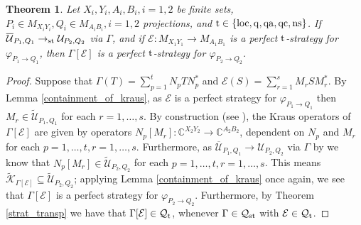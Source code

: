 \documentclass[11pt]{amsart}
\newtheorem{theorem}{Theorem}[section]
\newcommand{\cl}[1]{\mathcal{#1}}
\newcommand{\bb}[1]{\mathbb{#1}}
\begin{document}
\begin{theorem}\label{perfect_strats_imp_games}
Let $X_{i}, Y_{i}, A_{i}, B_{i}, i = 1, 2$ be finite sets, $P_{i} \in M_{X_{i}Y_{i}}, Q_{i} \in M_{A_{i}B_{i}}, i = 1, 2$ projections, and ${\rm t} \in \{\rm loc, q, qa, qc, ns\}$. If $\overline{\cl{U}}_{P_{1}, Q_{1}}\rightarrow_{\rm st} \cl{U}_{P_{2}, Q_{2}}$ via $\Gamma$, and if $\cl{E}: M_{X_{1}Y_{1}}\rightarrow M_{A_{1}B_{1}}$ is a perfect ${\rm t}$-strategy for $\varphi_{P_{1}\rightarrow Q_{1}}$, then $\Gamma[\cl{E}]$ is a perfect ${\rm t}$-strategy for $\varphi_{P_{2}\rightarrow Q_{2}}$. 
\end{theorem}
\begin{proof}
Suppose that $\Gamma(T) = \sum\limits_{p=1}^{t}N_{p}TN_{p}^{*}$ and $\cl{E}(S) = \sum\limits_{r=1}^{s}M_{r}SM_{r}^{*}$. By Lemma \ref{containment_of_kraus}, as $\cl{E}$ is a perfect strategy for $\varphi_{P_{1}\rightarrow Q_{1}}$ then $M_{r} \in \tilde{\cl{U}}_{P_{1}, Q_{1}}$ for each $r = 1, \hdots, s$. By construction (see \cite{gt_two}), the Kraus operators of $\Gamma[\cl{E}]$ are given by operators $N_{p}[M_{r}]: \bb{C}^{X_{2}Y_{2}}\rightarrow \bb{C}^{A_{2}B_{2}}$, dependent on $N_{p}$ and $M_{r}$ for each $p= 1, \hdots, t, r= 1, \hdots, s$. Furthermore, as $\overline{\cl{U}}_{P_{1}, Q_{1}}\rightarrow \cl{U}_{P_{2}, Q_{2}}$ via $\Gamma$ by \cite[Theorem 5.5]{gt_two} we know that $N_{p}[M_{r}] \in \tilde{\cl{U}}_{P_{2}, Q_{2}}$ for each $p = 1, \hdots, t, r = 1, \hdots, s$. This means $\tilde{\cl{K}}_{\Gamma[\cl{E}]} \subseteq \tilde{\cl{U}}_{P_{2}, Q_{2}}$; applying Lemma \ref{containment_of_kraus} once again, we see that $\Gamma[\cl{E}]$ is a perfect strategy for $\varphi_{P_{2}\rightarrow Q_{2}}$. Furthermore, by Theorem \ref{strat_transp} we have that $\Gamma[\cl{E}] \in \cl{Q}_{\rm t}$, whenever $\Gamma \in \cl{Q}_{\rm st}$ with $\cl{E} \in \cl{Q}_{\rm t}$. 
\end{proof}
\end{document}
